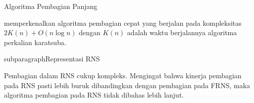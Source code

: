     \begin{algorithm}
      \caption{Algoritma Pembagian Panjang}
      \label{alg:long_div}
      \begin{algorithmic}[1]
        \Statex
          \Else
          \EndIf
            \EndWhile
            \State {}
          \EndFor
        \EndFunction
      \end{algorithmic}

    \end{algorithm}

    \citet{div_burnikel_ziegler} memperkenalkan algoritma pembagian cepat yang berjalan pada kompleksitas $2K(n)+O(n \log n)$ dengan $K(n)$ adalah waktu berjalannya algoritma perkalian karatsuba.

    subparagraph{Representasi RNS}

    Pembagian dalam RNS cukup kompleks. Mengingat bahwa kinerja pembagian pada RNS pasti lebih buruk dibandingkan dengan pembagian pada FRNS, maka algoritma pembagian pada RNS tidak dibahas lebih lanjut.
